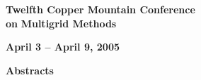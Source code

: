 \documentclass[twosided]{report}
\begin{document}
\begin{center}

{\Large {\bf Twelfth Copper Mountain Conference}} \\
{\large {\bf on}} {\Large {\bf Multigrid Methods}}

{\LARGE {\bf April 3 -- April 9, 2005}}

{\LARGE {\bf Abstracts}}

\end{center}



\end{document}
